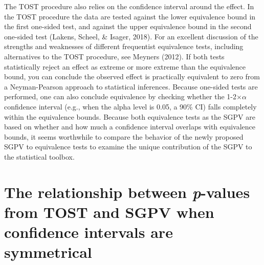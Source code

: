 \documentclass[,man,floatsintext]{apa6}
\begin{document}
The TOST procedure also relies on the confidence interval around the
effect. In the TOST procedure the data are tested against the lower
equivalence bound in the first one-sided test, and against the upper
equivalence bound in the second one-sided test (Lakens, Scheel, \&
Isager, 2018). For an excellent discussion of the strengths and
weaknesses of different frequentist equivalence tests, including
alternatives to the TOST procedure, see Meyners (2012). If both tests
statistically reject an effect as extreme or more extreme than the
equivalence bound, you can conclude the observed effect is practically
equivalent to zero from a Neyman-Pearson approach to statistical
inferences. Because one-sided tests are performed, one can also conclude
equivalence by checking whether the 1-2\(\times\)\(\alpha\) confidence
interval (e.g., when the alpha level is 0.05, a 90\% CI) falls
completely within the equivalence bounds. Because both equivalence tests
as the SGPV are based on whether and how much a confidence interval
overlaps with equivalence bounds, it seems worthwhile to compare the
behavior of the newly proposed SGPV to equivalence tests to examine the
unique contribution of the SGPV to the statistical toolbox.

\section{\texorpdfstring{The relationship between \emph{p}-values from
TOST and SGPV when confidence intervals are
symmetrical}{The relationship between p-values from TOST and SGPV when confidence intervals are symmetrical}}\label{the-relationship-between-p-values-from-tost-and-sgpv-when-confidence-intervals-are-symmetrical}
\end{document}
